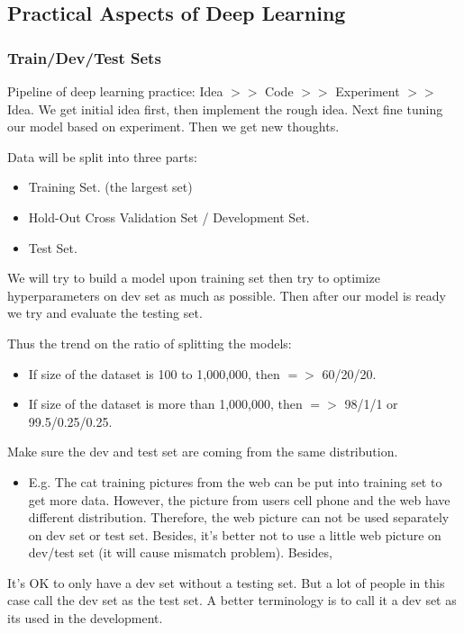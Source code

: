 \subsection{Practical Aspects of Deep Learning}
\subsubsection{Train/Dev/Test Sets}
Pipeline of deep learning practice: Idea $>>$ Code $>>$ Experiment $>>$ Idea. We get initial idea first, then implement the rough idea. Next fine tuning our model based on experiment. Then we get new thoughts.

Data will be split into three parts:

\begin{itemize}
    \item Training Set. (the largest set)
    \item Hold-Out Cross Validation Set / Development Set.
    \item Test Set.
\end{itemize}

We will try to build a model upon training set then try to optimize hyperparameters on dev set as much as possible. Then after our model is ready we try and evaluate the testing set.

Thus the trend on the ratio of splitting the models:
\begin{itemize}
    \item If size of the dataset is 100 to 1,000,000, then $=>$ 60/20/20.
    \item If size of the dataset is more than 1,000,000, then $=>$ 98/1/1 or 99.5/0.25/0.25.
\end{itemize}

Make sure the dev and test set are coming from the same distribution. 

\begin{itemize}
    \item E.g. The cat training pictures from the web can be put into training set to get more data. However, the picture from users cell phone and the web have different distribution. Therefore, the web picture can not be used separately on dev set or test set. Besides, it's better not to use a little web picture on dev/test set (it will cause mismatch problem). Besides, 
\end{itemize}

It's OK to only have a dev set without a testing set. But a lot of people in this case call the dev set as the test set. A better terminology is to call it a dev set as its used in the development.

